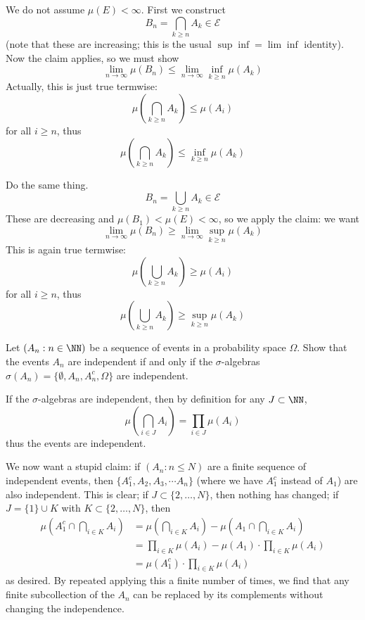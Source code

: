 \documentclass[11pt, headheight=30pt]{scrartcl}
\begin{document}
    
\begin{psec*}
    We do not assume $\mu(E) < \infty$. First we construct
    \[
        B_n =  \bigcap_{k\geq n} A_k \in \mathcal{E}   
    \]
    (note that these are increasing; this is the usual $\sup \inf = \lim \inf$
    identity).
    Now the claim applies, so we must show
    \[
        \lim_{n\to \infty} \mu\left(B_n\right) \leq \lim_{n\to \infty} \inf_{k\geq n} \mu(A_k)    
    \]
    Actually, this is just true termwise:
    \[
        \mu\left(\bigcap_{k\geq n} A_k\right) \leq \mu\left(A_i\right)
    \]
    for all $i \geq n$, thus
    \[
        \mu\left(\bigcap_{k\geq n} A_k\right) \leq \inf_{k\geq n} \mu(A_k)
    \]
\end{psec*}


\begin{psec*}
    Do the same thing.
    \[
        B_n =  \bigcup_{k\geq n} A_k \in \mathcal{E}   
    \]
    These are decreasing and $\mu(B_1) < \mu(E) < \infty$,
    so we apply the claim: we want
    \[
        \lim_{n\to \infty} \mu\left(B_n\right) \geq \lim_{n\to \infty} \sup_{k\geq n} \mu(A_k)    
    \]
    This is again true termwise:
    \[
        \mu\left(\bigcup_{k\geq n} A_k\right) \geq \mu\left(A_i\right)
    \]
    for all $i \geq n$, thus
    \[
        \mu\left(\bigcup_{k\geq n} A_k\right) \geq \sup_{k\geq n} \mu(A_k)
    \]
\end{psec*}

\begin{prob}
    Let $(A_n : n \in \NN)$ be a sequence of events in a
    probability space $\Omega$. Show that the events $A_n$
    are independent if and only if the $\sigma$-algebras
    $\sigma(A_n) = \{\emptyset, A_n, A_n^c, \Omega\}$ are independent.
\end{prob}

If the $\sigma$-algebras
are independent, then by definition for any $J\subset \NN$,
\[
    \mu\left(\bigcap_{i\in J} A_i\right) = \prod_{i\in J} \mu(A_i)
\]
thus the events are independent.

We now want a stupid claim: if $(A_n : n\leq N)$ are a finite
sequence of independent events, then $\{A_1^c, A_2, A_3,\cdots A_n\}$
(where we have $A_1^c$ instead of $A_1$) are also independent. This is
clear; if $J \subset \{2,\dots, N\}$, then nothing has changed;
if $J = \{1\}\cup K$ with $K\subset \{2,\dots, N\}$, then
\begin{align*}
    \mu\left(A_1^c\cap \bigcap_{i\in K} A_i\right) &= \mu\left(\bigcap_{i\in K} A_i\right) - \mu\left(A_1\cap \bigcap_{i\in K} A_i\right)\\
    &= \prod_{i\in K} \mu(A_i) - \mu(A_1)\cdot \prod_{i\in K} \mu(A_i)\\
    &= \mu(A_1^c)\cdot \prod_{i\in K} \mu(A_i)    
\end{align*}
as desired. By repeated applying this a finite number of
times, we find that any finite subcollection of the $A_n$
can be replaced by its complements without changing
the independence.
\end{document}
